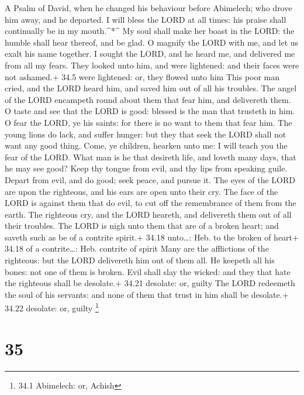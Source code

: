 A Psalm of David, when he changed his behaviour before Abimelech; who
drove him away, and he departed.  I will bless the LORD at
all times: his praise shall continually be in my mouth.\^{}*\^{}
 My soul shall make her boast in the LORD: the humble shall
hear thereof, and be glad.  O magnify the LORD with me, and
let us exalt his name together.  I sought the LORD, and he
heard me, and delivered me from all my fears.  They looked
unto him, and were lightened: and their faces were not ashamed.+ 34.5
were lightened: or, they flowed unto him  This poor man
cried, and the LORD heard him, and saved him out of all his troubles.
 The angel of the LORD encampeth round about them that fear
him, and delivereth them.  O taste and see that the LORD is
good: blessed is the man that trusteth in him.  O fear the
LORD, ye his saints: for there is no want to them that fear him.
 The young lions do lack, and suffer hunger: but they that
seek the LORD shall not want any good thing.  Come, ye
children, hearken unto me: I will teach you the fear of the LORD.
 What man is he that desireth life, and loveth many days,
that he may see good?  Keep thy tongue from evil, and thy
lips from speaking guile.  Depart from evil, and do good;
seek peace, and pursue it.  The eyes of the LORD are upon
the righteous, and his ears are open unto their cry.  The
face of the LORD is against them that do evil, to cut off the
remembrance of them from the earth.  The righteous cry, and
the LORD heareth, and delivereth them out of all their troubles.
 The LORD is nigh unto them that are of a broken heart; and
saveth such as be of a contrite spirit.+ 34.18 unto\ldots: Heb. to the
broken of heart+ 34.18 of a contrite\ldots: Heb. contrite of spirit
 Many are the afflictions of the righteous: but the LORD
delivereth him out of them all.  He keepeth all his bones:
not one of them is broken.  Evil shall slay the wicked: and
they that hate the righteous shall be desolate.+ 34.21 desolate: or,
guilty  The LORD redeemeth the soul of his servants: and
none of them that trust in him shall be desolate.+ 34.22 desolate: or,
guilty \footnote{34.1 Abimelech: or, Achish}

\hypertarget{section-34}{%
\section{35}\label{section-34}}

